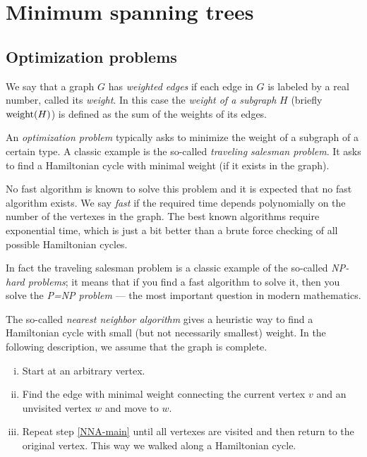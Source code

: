 \chapter{Minimum spanning trees}


\section*{Optimization problems}

We say that a graph $G$ has \emph{weighted edges} if each edge in $G$ is labeled by a real number, called its \emph{weight}.
In this case the \emph{weight of a subgraph} $H$ (briefly $\mathop{\rm weight}\nolimits(H)$) is defined as the sum of the weights of its edges.

An {}\emph{optimization problem} typically asks to minimize the weight of a subgraph of a certain type.
A classic example is the so-called \emph{traveling salesman problem}.
It asks to find a Hamiltonian cycle with minimal weight (if it exists in the graph).

No fast algorithm is known to solve this problem and it is expected that no fast algorithm exists.
We say {}\emph{fast} if the required time depends polynomially on the number of the vertexes in the graph.
The best known algorithms require exponential time, which is just a bit better than a brute force checking of all possible Hamiltonian cycles.

In fact the traveling salesman problem is a classic example of the so-called {}\emph{NP-hard problems}; it means that if you find a fast algorithm to solve it, then you solve the \emph{P=NP problem} --- the most important question in modern mathematics.

The so-called \emph{nearest neighbor algorithm} gives a heuristic way to find a Hamiltonian cycle with small (but not necessarily smallest) weight.
In the following description, we assume that the graph is complete.
\begin{enumerate}[(i)]
\item Start at an arbitrary vertex.
\item\label{NNA-main} Find the edge with minimal weight connecting the current vertex $v$ and an unvisited vertex $w$ and move to $w$.
\item Repeat step \ref{NNA-main} until all vertexes are visited and then return to the original vertex.
This way we walked along a Hamiltonian cycle.
\end{enumerate}

